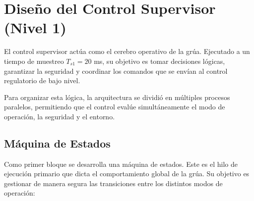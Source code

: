 \documentclass[11pt]{article}                                    %
\begin{document}
\section{Diseño del Control Supervisor (Nivel 1)}
El control supervisor actúa como el cerebro operativo de la grúa. Ejecutado a un tiempo de muestreo $T_{s1} = 20$ ms, su objetivo es tomar decisiones lógicas, garantizar la seguridad y coordinar los comandos que se envían al control regulatorio de bajo nivel. 

Para organizar esta lógica, la arquitectura se dividió en múltiples procesos paralelos, permitiendo que el control evalúe simultáneamente el modo de operación, la seguridad y el entorno.

\subsection{Máquina de Estados}
Como primer bloque se desarrolla una máquina de estados. Este es el hilo de ejecución primario que dicta el comportamiento global de la grúa. Su objetivo es gestionar de manera segura las transiciones entre los distintos modos de operación:
\end{document}
